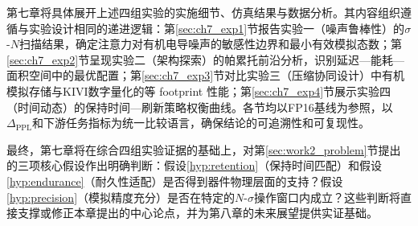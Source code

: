 第七章将具体展开上述四组实验的实施细节、仿真结果与数据分析。其内容组织遵循与实验设计相同的递进逻辑：第\ref{sec:ch7_exp1}节报告实验一（噪声鲁棒性）的$\sigma$-$N$扫描结果，确定注意力对有机电导噪声的敏感性边界和最小有效模拟态数；第\ref{sec:ch7_exp2}节呈现实验二（架构探索）的帕累托前沿分析，识别延迟—能耗—面积空间中的最优配置；第\ref{sec:ch7_exp3}节对比实验三（压缩协同设计）中有机模拟存储与KIVI数字量化的等 footprint 性能；第\ref{sec:ch7_exp4}节展示实验四（时间动态）的保持时间—刷新策略权衡曲线。各节均以FP16基线为参照，以$\Delta_{\text{PPL}}$和下游任务指标为统一比较语言，确保结论的可追溯性和可复现性。

最终，第七章将在综合四组实验证据的基础上，对第\ref{sec:work2_problem}节提出的三项核心假设作出明确判断：假设\ref{hyp:retention}（保持时间匹配）和假设\ref{hyp:endurance}（耐久性适配）是否得到器件物理层面的支持？假设\ref{hyp:precision}（模拟精度充分）是否在特定的$N$-$\sigma$操作窗口内成立？这些判断将直接支撑或修正本章提出的中心论点，并为第八章的未来展望提供实证基础。
